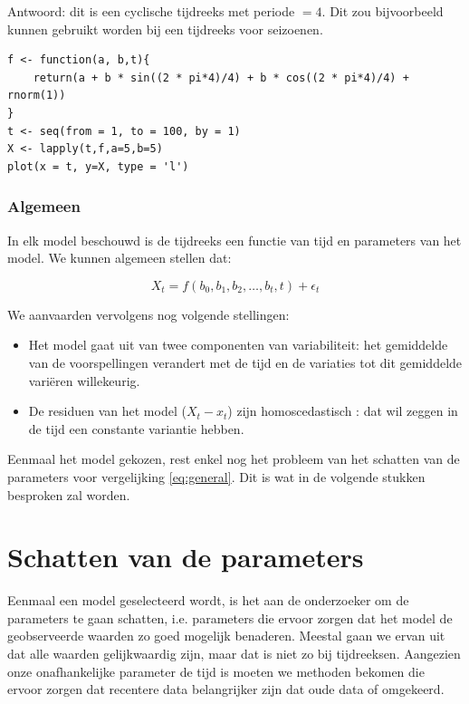 \begin{solution}
Antwoord: dit is een cyclische tijdreeks met periode $= 4$. Dit zou bijvoorbeeld kunnen gebruikt worden bij een tijdreeks voor seizoenen. 

\begin{lstlisting}
f <- function(a, b,t){
	return(a + b * sin((2 * pi*4)/4) + b * cos((2 * pi*4)/4) + rnorm(1))
}
t <- seq(from = 1, to = 100, by = 1)
X <- lapply(t,f,a=5,b=5)
plot(x = t, y=X, type = 'l')
\end{lstlisting}
	
\end{solution}



\subsubsection{Algemeen}

In elk model beschouwd is de tijdreeks een functie van tijd en parameters van het model. We kunnen algemeen stellen dat:

\begin{equation}
	X_{t} = f(b_{0}, b_{1}, b_{2}, \dots , b_{t}, t) + \epsilon_{t}
\label{eq:general}
\end{equation}

We aanvaarden vervolgens nog volgende stellingen:
\begin{itemize}
	\item Het model gaat uit van twee componenten van variabiliteit: het gemiddelde van de voorspellingen verandert met de tijd en de variaties tot dit gemiddelde vari\"eren willekeurig.
	\item De residuen van het model ($X_{t} - x_{t}$) zijn homoscedastisch : dat wil zeggen in de tijd een constante variantie hebben.
\end{itemize}

Eenmaal het model gekozen, rest enkel nog het  probleem van het schatten van de parameters voor vergelijking \ref{eq:general}. Dit is wat in de volgende stukken besproken zal worden.

\section{Schatten van de parameters}
Eenmaal een model geselecteerd wordt, is het aan de onderzoeker om de parameters te gaan schatten, i.e. parameters die ervoor zorgen dat het model de geobserveerde waarden zo goed mogelijk benaderen. Meestal gaan we ervan uit dat alle waarden gelijkwaardig zijn, maar dat is niet zo bij tijdreeksen. Aangezien onze onafhankelijke parameter de tijd is moeten we methoden bekomen die ervoor zorgen dat recentere data belangrijker zijn dat oude data of omgekeerd. 

